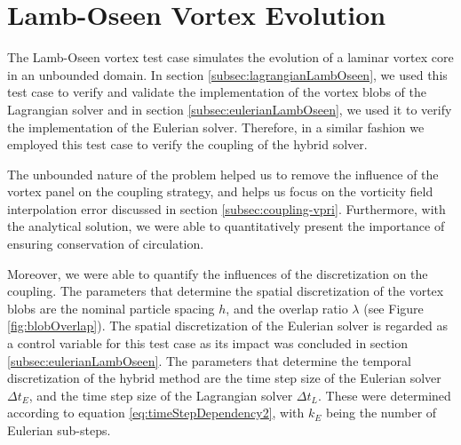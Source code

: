 \section{Lamb-Oseen Vortex Evolution}
\label{sec:vvhm-love}
The Lamb-Oseen vortex test case simulates the evolution of a laminar vortex core in an unbounded domain. In section \ref{subsec:lagrangianLambOseen}, we used this test case to verify and validate the implementation of the vortex blobs of the Lagrangian solver and in section \ref{subsec:eulerianLambOseen}, we used it to verify the implementation of the Eulerian solver. Therefore, in a similar fashion we employed this test case to verify the coupling of the hybrid solver. 

The unbounded nature of the problem helped us to remove the influence of the vortex panel on the coupling strategy, and helps us focus on the vorticity field interpolation error discussed in section \ref{subsec:coupling-vpri}. Furthermore, with the analytical solution, we were able to quantitatively present the importance of ensuring conservation of circulation. 


Moreover, we were able to quantify the influences of the discretization on the coupling. The parameters that determine the spatial discretization of the vortex blobs are the nominal particle spacing $h$, and the overlap ratio $\lambda$ (see Figure \ref{fig:blobOverlap}). The spatial discretization of the Eulerian solver is regarded as a control variable for this test case as its impact was concluded in section \ref{subsec:eulerianLambOseen}. The parameters that determine the temporal discretization of the hybrid method are the time step size of the Eulerian solver $\Delta t_E$, and the time step size of the Lagrangian solver $\Delta t_L$. These were determined according to equation \ref{eq:timeStepDependency2}, with  $k_E$ being the number of Eulerian sub-steps.



